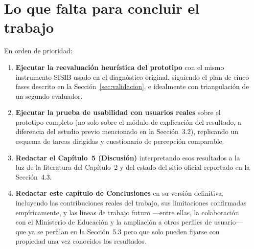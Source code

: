 \section*{Lo que falta para concluir el trabajo}

En orden de prioridad:

\begin{enumerate}
    \item \textbf{Ejecutar la reevaluación heurística del prototipo} con el mismo instrumento SISIB usado en el diagnóstico original, siguiendo el plan de cinco fases descrito en la Sección~\ref{sec:validacion}, e idealmente con triangulación de un segundo evaluador.
    \item \textbf{Ejecutar la prueba de usabilidad con usuarios reales} sobre el prototipo completo (no solo sobre el módulo de explicación del resultado, a diferencia del estudio previo mencionado en la Sección~3.2), replicando un esquema de tareas dirigidas y cuestionario de percepción comparable.
    \item \textbf{Redactar el Capítulo~5 (Discusión)} interpretando esos resultados a la luz de la literatura del Capítulo~2 y del estado del sitio oficial reportado en la Sección~4.3.
    \item \textbf{Redactar este capítulo de Conclusiones} en su versión definitiva, incluyendo las contribuciones reales del trabajo, sus limitaciones confirmadas empíricamente, y las líneas de trabajo futuro —entre ellas, la colaboración con el Ministerio de Educación y la ampliación a otros perfiles de usuario— que ya se perfilan en la Sección~5.3 pero que solo pueden fijarse con propiedad una vez conocidos los resultados.
\end{enumerate}
